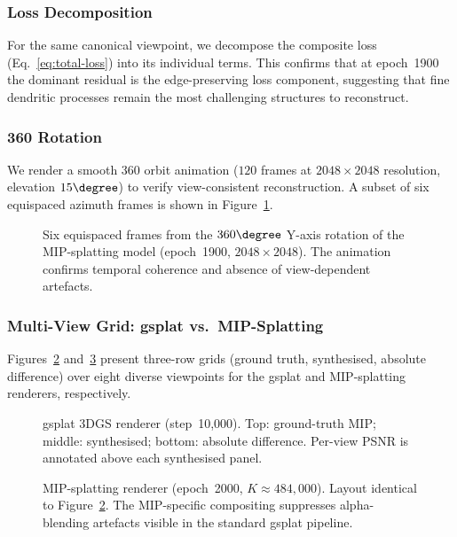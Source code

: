 \subsubsection{Loss Decomposition}
For the same canonical viewpoint, we decompose the composite loss
(Eq.~\ref{eq:total-loss}) into its individual terms.  This confirms
that at epoch~1900 the dominant residual is the edge-preserving loss
component, suggesting that fine dendritic processes remain the most
challenging structures to reconstruct.

\subsubsection{360\textdegree{} Rotation}
We render a smooth 360\textdegree{} orbit animation ($120$ frames at
$2048\times2048$ resolution, elevation $15\degree$) to verify
view-consistent reconstruction.
A subset of six equispaced azimuth frames is shown in
Figure~\ref{fig:rotation-strip}.

\begin{figure}[htbp]
  \centering
  \caption{%
    Six equispaced frames from the $360\degree$ Y-axis rotation of
    the MIP-splatting model (epoch~1900, $2048\times2048$).
    The animation confirms temporal coherence and absence of
    view-dependent artefacts.%
  }
  \label{fig:rotation-strip}
\end{figure}

\subsubsection{Multi-View Grid: gsplat vs.\ MIP-Splatting}

Figures~\ref{fig:gsplat-grid} and~\ref{fig:mip-grid} present
three-row grids (ground truth, synthesised, absolute difference) over
eight diverse viewpoints for the gsplat and MIP-splatting renderers,
respectively.

\begin{figure}[htbp]
  \centering
  \caption{%
    gsplat 3DGS renderer (step~10{,}000).
    Top: ground-truth MIP; middle: synthesised; bottom: absolute
    difference.  Per-view PSNR is annotated above each synthesised
    panel.%
  }
  \label{fig:gsplat-grid}
\end{figure}

\begin{figure}[htbp]
  \centering
  \caption{%
    MIP-splatting renderer (epoch~2000, $K\approx484{,}000$).
    Layout identical to Figure~\ref{fig:gsplat-grid}.
    The MIP-specific compositing suppresses alpha-blending artefacts
    visible in the standard gsplat pipeline.%
  }
  \label{fig:mip-grid}
\end{figure}

